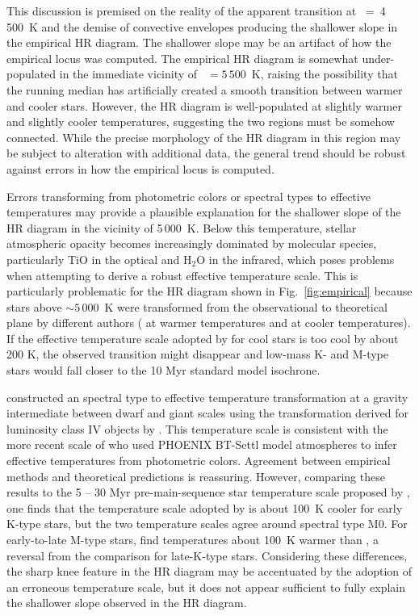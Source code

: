 \documentclass{aa}
\begin{document}
This discussion is premised on the reality of the apparent transition at \teff~=~4\,500~K and the demise of convective envelopes producing the shallower slope in the empirical HR diagram. The shallower slope may be an artifact of how the empirical locus was computed. The empirical HR diagram is somewhat under-populated in the immediate vicinity of \teff~$= 5\,500$~K, raising the possibility that the running median has artificially created a smooth transition between warmer and cooler stars. However, the HR diagram is well-populated at slightly warmer and slightly cooler temperatures, suggesting the two regions must be somehow connected. While the precise morphology of the HR diagram in this region may be subject to alteration with additional data, the general trend should be robust against errors in how the empirical locus is computed.

Errors transforming from photometric colors or spectral types to effective temperatures may provide a plausible explanation for the shallower slope of the HR diagram in the vicinity of 5\,000~K. Below this temperature, stellar atmospheric opacity becomes increasingly dominated by molecular species, particularly TiO in the optical and H$_2$O in the infrared, which poses problems when attempting to derive a robust effective temperature scale. This is particularly problematic for the HR diagram shown in Fig.~\ref{fig:empirical} because stars above \teff$ \sim 5\,000$~K were transformed from the observational to theoretical plane by different authors (\citealt{Pecaut2012} at warmer temperatures and \citealt{Preibisch1999} at cooler temperatures). If the effective temperature scale adopted by \citet{Preibisch1999} for cool stars is too cool by about 200 K, the observed transition might disappear and low-mass K- and M-type stars would fall closer to the 10 Myr standard model isochrone.

\citet{Preibisch1999} constructed an spectral type to effective temperature transformation at a gravity intermediate between dwarf and giant scales using the transformation derived for luminosity class IV objects by \citet{deJager1987}. This temperature scale is consistent with the more recent scale of \citet{Herczeg2015} who used PHOENIX BT-Settl model atmospheres \citep{Allard2011} to infer effective temperatures from photometric colors. Agreement between empirical methods and theoretical predictions is reassuring. However, comparing these results to the 5 -- 30 Myr pre-main-sequence star temperature scale proposed by \citet{Pecaut2013}, one finds that the temperature scale adopted by \citeauthor{Preibisch1999} is about 100~K cooler for early K-type stars, but the two temperature scales agree around spectral type M0. For early-to-late M-type stars, \citeauthor{Preibisch1999} find temperatures about 100~K warmer than \citet{Pecaut2013}, a reversal from the comparison for late-K-type stars. Considering these differences, the sharp knee feature in the HR diagram may be accentuated by the adoption of an erroneous temperature scale, but it does not appear sufficient to fully explain the shallower slope observed in the HR diagram.
\end{document}
